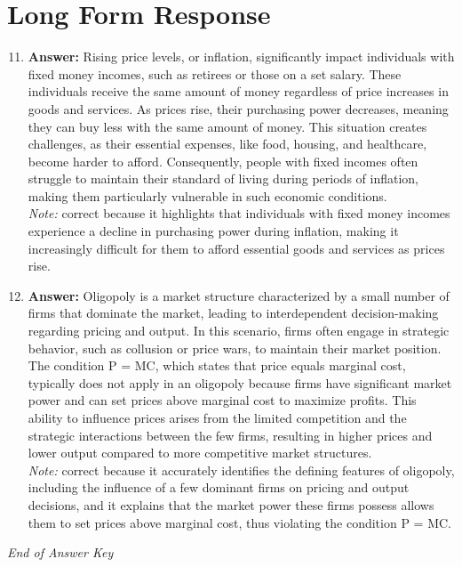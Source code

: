 \documentclass[12pt]{article}
\begin{document}
\section*{Long Form Response}
\begin{enumerate}[label=\arabic*.]
\setcounter{enumi}{10}
\item \textbf{Answer:} Rising price levels, or inflation, significantly impact individuals with fixed money incomes, such as retirees or those on a set salary. These individuals receive the same amount of money regardless of price increases in goods and services. As prices rise, their purchasing power decreases, meaning they can buy less with the same amount of money. This situation creates challenges, as their essential expenses, like food, housing, and healthcare, become harder to afford. Consequently, people with fixed incomes often struggle to maintain their standard of living during periods of inflation, making them particularly vulnerable in such economic conditions.
\\ \textit{Note:} correct because it highlights that individuals with fixed money incomes experience a decline in purchasing power during inflation, making it increasingly difficult for them to afford essential goods and services as prices rise.
\item \textbf{Answer:} Oligopoly is a market structure characterized by a small number of firms that dominate the market, leading to interdependent decision-making regarding pricing and output. In this scenario, firms often engage in strategic behavior, such as collusion or price wars, to maintain their market position. The condition P = MC, which states that price equals marginal cost, typically does not apply in an oligopoly because firms have significant market power and can set prices above marginal cost to maximize profits. This ability to influence prices arises from the limited competition and the strategic interactions between the few firms, resulting in higher prices and lower output compared to more competitive market structures.
\\ \textit{Note:} correct because it accurately identifies the defining features of oligopoly, including the influence of a few dominant firms on pricing and output decisions, and it explains that the market power these firms possess allows them to set prices above marginal cost, thus violating the condition P = MC.
\end{enumerate}

\vfill
\noindent\textit{End of Answer Key}
\end{document}
